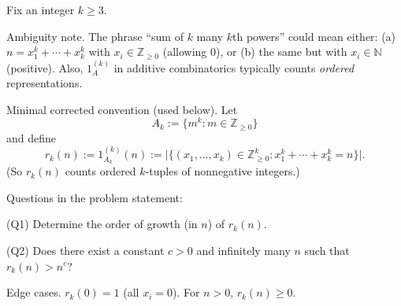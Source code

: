 Fix an integer $k\ge 3$.

Ambiguity note.
The phrase ``sum of $k$ many $k$th powers'' could mean either:
(a) $n=x_1^k+\cdots+x_k^k$ with $x_i\in\mathbb Z_{\ge 0}$ (allowing $0$), or
(b) the same but with $x_i\in\mathbb N$ (positive).
Also, $1_A^{(k)}$ in additive combinatorics typically counts \emph{ordered} representations.

Minimal corrected convention (used below).
Let
\[
A_k:=\{m^k: m\in\mathbb Z_{\ge 0}\}
\]
and define
\[
r_k(n):=1_{A_k}^{(k)}(n):=\bigl|\{(x_1,\dots,x_k)\in \mathbb Z_{\ge 0}^k: x_1^k+\cdots+x_k^k=n\}\bigr|.
\]
(So $r_k(n)$ counts ordered $k$-tuples of nonnegative integers.)

Questions in the problem statement:

(Q1) Determine the order of growth (in $n$) of $r_k(n)$.

(Q2) Does there exist a constant $c>0$ and infinitely many $n$ such that $r_k(n)>n^c$?

Edge cases.
$r_k(0)=1$ (all $x_i=0$). For $n>0$, $r_k(n)\ge 0$.
